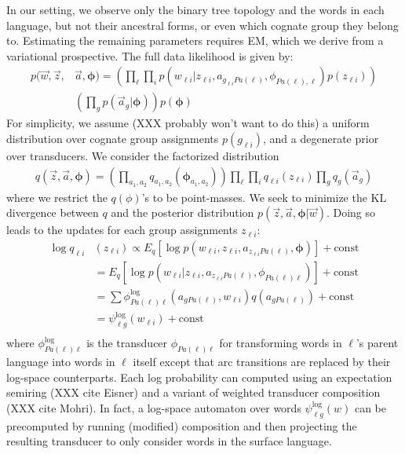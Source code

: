 \documentclass[11pt]{article}
\begin{document}
In our setting, we observe only the binary tree topology and the words in each language, but not their ancestral forms, or even which cognate group they belong to. Estimating
the remaining parameters requires EM, which we derive from a variational prospective. The full data likelihood is given by:
\begin{equation}
  \begin{split}
    p(\vec w, \vec z, &\vec a, \mathbf{\phi}) = (\prod_\ell \prod_i p(w_{\ell
    i}|z_{\ell i},a_{g_{\ell i}Pa(\ell)},\phi_{Pa(\ell),\ell})p(z_{\ell i}))\\
      & (\prod_g p(\vec a_g|\mathbf{\phi}) ) p(\mathbf{\phi})
   \end{split}
 \end{equation}
 For simplicity, we assume (XXX probably won't want to do this) a uniform distribution over cognate group assignments $p(g_{\ell i })$, and a degenerate prior over
 transducers.
 We consider the factorized distribution 
 \begin{equation}
   \begin{split}
      q(\vec z, \vec a, \mathbf{\phi}) = (\prod_{a_1,a_2} q_{a_1,a_2}(\mathbf{\phi}_{a_1,a_2}))\prod_\ell \prod_i q_{\ell i}(z_{\ell i})\prod_g
 q_g(\vec a_g)
    \end{split}
  \end{equation}
 where we restrict the $q(\phi)$'s to be point-masses. We seek to
 minimize the KL divergence between $q$ and the posterior distribution $p(\vec z,
 \vec a, \mathbf{\phi}| \vec w)$. Doing so leads to the updates for each group
 assignments $z_{\ell i}$:
 \begin{equation}
   \begin{split}
     \log q_{\ell i}&(z_{\ell i}) \propto E_q[\log p(w_{\ell i}, z_{\ell i}, a_{z_{\ell i} Pa(\ell)},\mathbf{\phi})] + \mathrm{const}\\
     &= E_q[\log  p(w_{\ell i}|z_{\ell i},a_{z_{\ell i}Pa(\ell)},\phi_{Pa(\ell)\ell}) ] + \mathrm{const}\\
     &= \sum \phi^{\log}_{Pa(\ell)\ell}(a_{gPa(\ell)},w_{\ell i}) q(a_{gPa(\ell)}) + \mathrm{const}\\
     &= \psi^{\log}_{\ell g}(w_{\ell i}) + \mathrm{const}\\
    \end{split}
  \end{equation}
where $\phi^{\log}_{Pa(\ell)\ell}$ is the transducer
$\phi_{Pa(\ell)\ell}$ for transforming words in $\ell$'s parent
language into words in $\ell$ itself except that arc transitions
are replaced by their log-space counterparts. Each log probability
can computed using an expectation semiring (XXX cite Eisner) and a
variant of weighted transducer composition (XXX cite Mohri). In
fact, a log-space automaton over words $\psi^{\log}_{\ell g}(w)$
can be precomputed by running (modified) composition and then
projecting the resulting transducer to only consider words in the
surface language.
\end{document}
